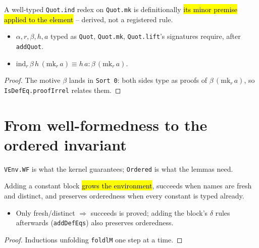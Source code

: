 \begin{theorem}
\label{thm:quotind-defeq}
\leanok
{}

 A well-typed \texttt{Quot.ind} redex on \texttt{Quot.mk} is definitionally
\hl{its minor premise applied to the element} -- derived, not a registered rule.
\begin{itemize}
\item {} $\alpha,r,\beta,h,a$ typed as \texttt{Quot}, \texttt{Quot.mk},
  \texttt{Quot.lift}'s signatures require, after \texttt{addQuot}.
\item {} $\mathrm{ind}_r\,\beta\,h\,(\mathrm{mk}_r\,a) \equiv h\,a : \beta\,(\mathrm{mk}_r\,a)$.
\end{itemize}
\end{theorem}
\begin{proof}
\leanok
{} The motive $\beta$ lands in \texttt{Sort 0}: both sides type as proofs of
$\beta\,(\mathrm{mk}_r\,a)$, so \texttt{IsDefEq.proofIrrel} relates them.
\end{proof}

\section{From well-formedness to the ordered invariant}

\texttt{VEnv.WF} is what the kernel guarantees; \texttt{Ordered} is what the lemmas need.

\begin{lemma}
\label{fam:addconsts}
\leanok
{}

 Adding a constant block \hl{grows the environment}, succeeds when names are
fresh and distinct, and preserves orderedness when every constant is typed already.
\begin{itemize}
\item Only fresh/distinct $\Rightarrow$ succeeds is proved; adding the block's $\delta$
  rules afterwards (\texttt{addDefEqs}) also preserves orderedness.
\end{itemize}
\end{lemma}
\begin{proof}
\leanok
{} Inductions unfolding \texttt{foldlM} one step at a time.
\end{proof}

